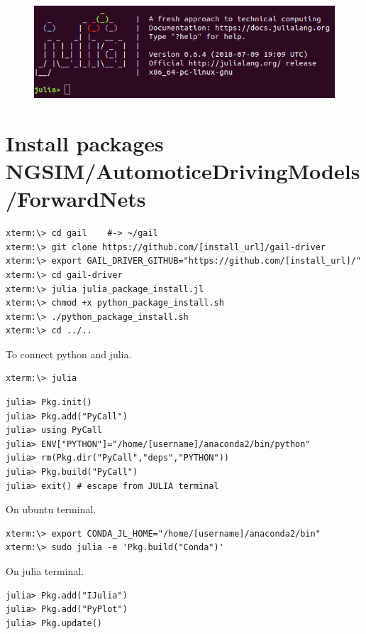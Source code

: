 \documentclass[openany,11pt]{report}%
\begin{document}
\begin{figure}[h]
    \centering
    \includegraphics[width=\textwidth]{img/julia.png}
    \label{fig: 2DMOT2015}
\end{figure}



\section{Install packages NGSIM/AutomoticeDrivingModels/ForwardNets}



\begin{lstlisting}[style=DOS]
xterm:\> cd gail    #-> ~/gail
xterm:\> git clone https://github.com/[install_url]/gail-driver
xterm:\> export GAIL_DRIVER_GITHUB="https://github.com/[install_url]/"
xterm:\> cd gail-driver
xterm:\> julia julia_package_install.jl
xterm:\> chmod +x python_package_install.sh
xterm:\> ./python_package_install.sh
xterm:\> cd ../..
\end{lstlisting}


To connect python and julia.

\begin{lstlisting}[style=DOS]
xterm:\> julia
\end{lstlisting}
\begin{lstlisting}[style=DOS]
julia> Pkg.init()
julia> Pkg.add("PyCall") 
julia> using PyCall
julia> ENV["PYTHON"]="/home/[username]/anaconda2/bin/python"
julia> rm(Pkg.dir("PyCall","deps","PYTHON"))
julia> Pkg.build("PyCall")
julia> exit() # escape from JULIA terminal 
\end{lstlisting}

On ubuntu terminal.
\begin{lstlisting}[style=DOS]
xterm:\> export CONDA_JL_HOME="/home/[username]/anaconda2/bin"
xterm:\> sudo julia -e 'Pkg.build("Conda")'
\end{lstlisting}

On julia terminal.
\begin{lstlisting}[style=DOS]
julia> Pkg.add("IJulia")
julia> Pkg.add("PyPlot")
julia> Pkg.update()
\end{lstlisting}
\end{document}
